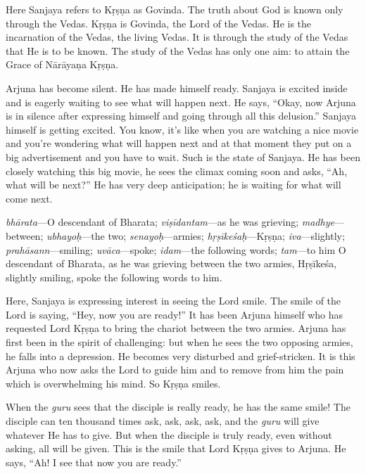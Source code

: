 Here Sanjaya refers to Kṛṣṇa as Govinda. The truth about God is known only through the Vedas. Kṛṣṇa is Govinda, the Lord of the Vedas. He is the incarnation of the Vedas, the living Vedas. It is through the study of the Vedas that He is to be known. The study of the Vedas has only one aim: to attain the Grace of Nārāyaṇa Kṛṣṇa.

Arjuna has become silent. He has made himself ready. Sanjaya is excited inside and is eagerly waiting to see what will happen next. He says, “Okay, now Arjuna is in silence after expressing himself and going through all this delusion.” Sanjaya himself is getting excited. You know, it’s like when you are watching a nice movie and you’re wondering what will happen next and at that moment they put on a big advertisement and you have to wait. Such is the state of Sanjaya. He has been closely watching this big movie, he sees the climax coming soon and asks, “Ah, what will be next?” He has very deep anticipation; he is waiting for what will come next.

{%
  \textit{bhārata}---O descendant of Bharata; 
  \textit{viṣīdantam}---as he was grieving; 
  \textit{madhye}---between; 
  \textit{ubhayoḥ}---the two; 
  \textit{senayoḥ}---armies; 
  \textit{hṛṣīkeśaḥ}---Kṛṣṇa; 
  \textit{iva}---slightly; 
  \textit{prahāsann}---smiling; 
  \textit{uvāca}---spoke; 
  \textit{idam}---the following words; 
  \textit{tam}---to him
}
{%
  O descendant of Bharata, as he was grieving between the two armies, Hṛṣīkeśa, slightly smiling, spoke the following words to him.
}

Here, Sanjaya is expressing interest in seeing the Lord smile. The smile of the Lord is saying, “Hey, now you are ready!” It has been Arjuna himself who has requested Lord Kṛṣṇa to bring the chariot between the two armies. Arjuna has first been in the spirit of challenging: but when he sees the two opposing armies, he falls into a depression. He becomes very disturbed and grief-stricken. It is this Arjuna who now asks the Lord to guide him and to remove from him the pain which is overwhelming his mind. So Kṛṣṇa smiles.

When the \textit{guru} sees that the disciple is really ready, he has the same smile! The disciple can ten thousand times ask, ask, ask, ask, and the \textit{guru} will give whatever He has to give. But when the disciple is truly ready, even without asking, all will be given. This is the smile that Lord Kṛṣṇa gives to Arjuna. He says, “Ah! I see that now you are ready.”

